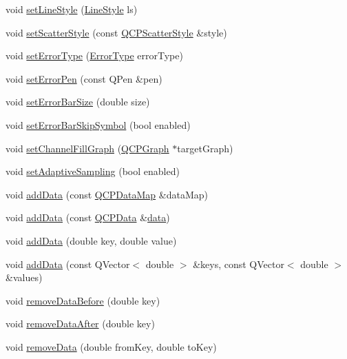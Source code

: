 \begin{DoxyCompactItemize}
\item 
void \hyperlink{classQCPGraph_a513fecccff5b2a50ce53f665338c60ff}{set\+Line\+Style} (\hyperlink{classQCPGraph_ad60175cd9b5cac937c5ee685c32c0859}{Line\+Style} ls)
\item 
void \hyperlink{classQCPGraph_a12bd17a8ba21983163ec5d8f42a9fea5}{set\+Scatter\+Style} (const \hyperlink{classQCPScatterStyle}{Q\+C\+P\+Scatter\+Style} \&style)
\item 
void \hyperlink{classQCPGraph_ac3614d799c3894f2bc646e99c7f73d38}{set\+Error\+Type} (\hyperlink{classQCPGraph_ad23b514404bd2cb3216f57c90904d6af}{Error\+Type} error\+Type)
\item 
void \hyperlink{classQCPGraph_abd4c7f81939e10776ea64603a704f22a}{set\+Error\+Pen} (const Q\+Pen \&pen)
\item 
void \hyperlink{classQCPGraph_a10f50c5495ce45ef559ec2066194a335}{set\+Error\+Bar\+Size} (double size)
\item 
void \hyperlink{classQCPGraph_ab1c1ee03d8dd94676a564e5e5f11aac2}{set\+Error\+Bar\+Skip\+Symbol} (bool enabled)
\item 
void \hyperlink{classQCPGraph_a2d03156df1b64037a2e36cfa50351ca3}{set\+Channel\+Fill\+Graph} (\hyperlink{classQCPGraph}{Q\+C\+P\+Graph} $\ast$target\+Graph)
\item 
void \hyperlink{classQCPGraph_ab468cd600160f327836aa0644291e64c}{set\+Adaptive\+Sampling} (bool enabled)
\item 
void \hyperlink{classQCPGraph_aa5c6181d84db72ce4dbe9dc15a34ef4f}{add\+Data} (const \hyperlink{qcustomplot_8h_a84a9c4a4c2216ccfdcb5f3067cda76e3}{Q\+C\+P\+Data\+Map} \&data\+Map)
\item 
void \hyperlink{classQCPGraph_a80cc91e1e0ef77eb50afc5b366d0efd9}{add\+Data} (const \hyperlink{classQCPData}{Q\+C\+P\+Data} \&\hyperlink{classQCPGraph_a2f58436df4f86a2792b776a21642b3d9}{data})
\item 
void \hyperlink{classQCPGraph_a0bf98b1972286cfb7b1c4b7dd6ae2012}{add\+Data} (double key, double value)
\item 
void \hyperlink{classQCPGraph_ab6da6377541fe80d892a9893a92db9c6}{add\+Data} (const Q\+Vector$<$ double $>$ \&keys, const Q\+Vector$<$ double $>$ \&values)
\item 
void \hyperlink{classQCPGraph_a9fe0b3e54e8c7b61319bd03337e21e99}{remove\+Data\+Before} (double key)
\item 
void \hyperlink{classQCPGraph_ae42d645ef617cfc75fc0df58e62c522a}{remove\+Data\+After} (double key)
\item 
void \hyperlink{classQCPGraph_a4a0fde50b7db9db0a85b5c5b6b10098f}{remove\+Data} (double from\+Key, double to\+Key)

\end{DoxyCompactItemize}
